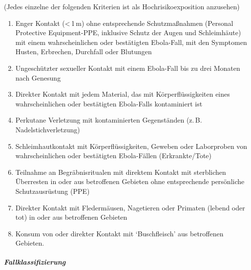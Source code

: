 {\begin{enumerate}
  (Jedes einzelne der folgenden Kriterien ist als Hochrisikoexposition anzusehen)
  \begin{enumerate}
    \item Enger Kontakt (<\,1\,m) ohne entsprechende Schutzmaßnahmen 
    (Personal Protective
    Equipment-PPE, inklusive Schutz der Augen und
    Schleimhäute) mit einem wahrscheinlichen oder bestätigten 
    Ebola-Fall, mit den
    Symptomen Husten, Erbrechen, Durchfall oder Blutungen
    \item Ungeschützter sexueller Kontakt 
    mit einem Ebola-Fall bis zu drei Monaten nach Genesung
    \item Direkter Kontakt mit jedem Material, das mit 
    Körperflüssigkeiten eines wahrscheinlichen
    oder bestätigten Ebola-Falls kontaminiert ist
    \item Perkutane Verletzung mit kontaminierten Gegenständen 
    (z.\,B. Nadelstichverletzung)
    \item Schleimhautkontakt mit 
    Körperflüssigkeiten, Geweben oder Laborproben von
    wahrscheinlichen oder bestätigten Ebola-Fällen 
    (Erkrankte/Tote)
    \item Teilnahme an Begräbnisritualen mit direktem Kontakt mit 
    sterblichen Überresten in oder
    aus betroffenen Gebieten ohne entsprechende persönliche 
    Schutzausrüstung (PPE)
    \item Direkter Kontakt mit Fledermäusen, Nagetieren oder Primaten 
    (lebend oder tot) in oder
    aus betroffenen Gebieten
    \item Konsum von oder direkter Kontakt mit 
    \enquote*{Buschfleisch} aus betroffenen Gebieten.
  \end{enumerate}
\end{enumerate}


\subparagraph{Fallklassifizierung}

}
